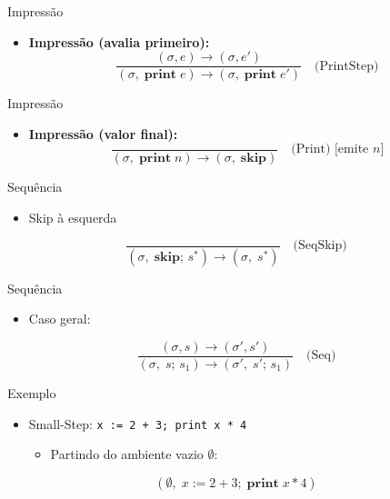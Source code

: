 \begin{frame}{Impressão}

    \begin{itemize}

        \item
        \textbf{Impressão (avalia primeiro):}
        \[\frac{(\sigma, e) \to (\sigma, e')}{(\sigma,\; \mathbf{print}\; e) \to (\sigma,\; \mathbf{print}\; e')} \quad\text{(PrintStep)}\]
    \end{itemize}
\end{frame}

\begin{frame}{Impressão}

    \begin{itemize}

        \item
        \textbf{Impressão (valor final):}
        \[\frac{}{(\sigma,\; \mathbf{print}\; n) \to (\sigma,\; \mathbf{skip})} \quad\text{(Print) [emite } n\text{]}\]
    \end{itemize}
\end{frame}

\begin{frame}{Sequência}

    \begin{itemize}

        \item
        Skip à esquerda
    \end{itemize}

    \[\frac{}{(\sigma,\; \mathbf{skip};\, s^*) \to (\sigma,\; s^*)} \quad\text{(SeqSkip)}\]
\end{frame}

\begin{frame}{Sequência}

    \begin{itemize}

        \item
        Caso geral:
    \end{itemize}

    \[\frac{(\sigma, s) \to (\sigma', s')}{(\sigma,\; s;\, s_1) \to (\sigma',\; s';\,s_1)} \quad\text{(Seq)}\]
\end{frame}

\begin{frame}[fragile]{Exemplo}

    \begin{itemize}

        \item
        Small-Step: \texttt{x := 2 + 3; print x * 4}

        \begin{itemize}

            \item
            Partindo do ambiente vazio \(\emptyset\):
        \end{itemize}
    \end{itemize}

    \[(\emptyset,\; x \mathbin{:=} 2+3;\; \mathbf{print}\; x*4)\]
\end{frame}

